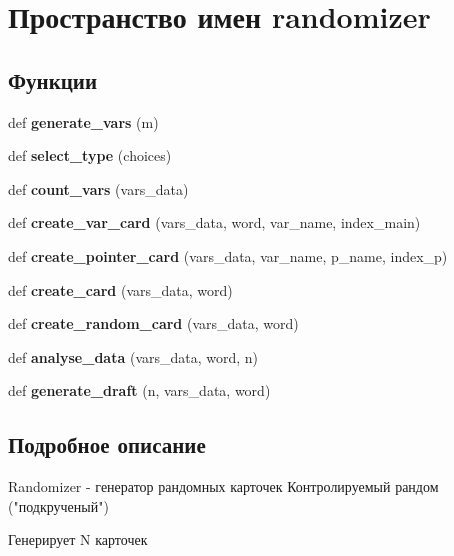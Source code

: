 \hypertarget{namespacerandomizer}{}\section{Пространство имен randomizer}
\label{namespacerandomizer}
\subsection*{Функции}
\begin{DoxyCompactItemize}
\item 
\mbox{\label{namespacerandomizer_ab63d4ca1de258168d7d326f0bafcc75d}} 
def {\bfseries generate\+\_\+vars} (m)
\item 
\mbox{\label{namespacerandomizer_a54b614b2484baa624742d3d6f8cb1d44}} 
def {\bfseries select\+\_\+type} (choices)
\item 
\mbox{\label{namespacerandomizer_a159facc8ad9d9497f8f14f9bc85a8fbc}} 
def {\bfseries count\+\_\+vars} (vars\+\_\+data)
\item 
\mbox{\label{namespacerandomizer_a52844c20d3bf544780f9e79b434c36d9}} 
def {\bfseries create\+\_\+var\+\_\+card} (vars\+\_\+data, word, var\+\_\+name, index\+\_\+main)
\item 
\mbox{\label{namespacerandomizer_a1d5de36cb843ddec815376767abc13c9}} 
def {\bfseries create\+\_\+pointer\+\_\+card} (vars\+\_\+data, var\+\_\+name, p\+\_\+name, index\+\_\+p)
\item 
\mbox{\label{namespacerandomizer_acb45ea4cfe88804e73621f301886a851}} 
def {\bfseries create\+\_\+card} (vars\+\_\+data, word)
\item 
\mbox{\label{namespacerandomizer_a52e2a15c2194f62c6ab31c38d01ad26e}} 
def {\bfseries create\+\_\+random\+\_\+card} (vars\+\_\+data, word)
\item 
\mbox{\label{namespacerandomizer_ad9f66f8f0f5cc96068e74150f67f7635}} 
def {\bfseries analyse\+\_\+data} (vars\+\_\+data, word, n)
\item 
\mbox{\label{namespacerandomizer_a8147fb6764576b01725962af72c014e4}} 
def {\bfseries generate\+\_\+draft} (n, vars\+\_\+data, word)
\end{DoxyCompactItemize}


\subsection{Подробное описание}
\begin{DoxyVerb}Randomizer - генератор рандомных карточек
Контролируемый рандом ("подкрученый")

Генерирует N карточек
\end{DoxyVerb}
 